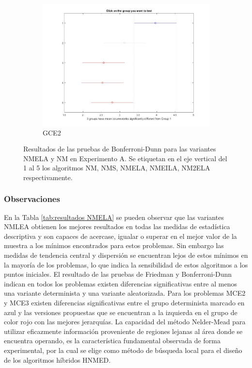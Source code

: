 \begin{figure}
\begin{subfigure}[b]{0.49\linewidth}
		\includegraphics[width=\linewidth]{Figures/NMELA_FB_P5}
		\caption{GCE2} \label{fig:M4} 
	\end{subfigure}
	\caption[Resultados de las pruebas de Bonferroni-Dunn para las variantes NMELA y NM en Experimento A.]{Resultados de las pruebas de Bonferroni-Dunn para las variantes NMELA y NM en Experimento A. Se etiquetan en el eje vertical del 1 al 5 los algoritmos NM, NMS, NMELA, NMEILA, NM2ELA respectivamente.} \label{fig: Bonferroni-Dunn -NMELA} 
	
\end{figure}
\subsubsection{Observaciones}
En la Tabla \ref{tab:resultados NMELA} se pueden observar que las variantes NMLEA obtienen los mejores resultados en todas las medidas de estadística descriptiva y son capaces de acercase, igualar o superar en el mejor valor de la muestra a los mínimos encontrados para estos problemas. Sin embargo las medidas de tendencia central y dispersión  se encuentran lejos de estos mínimos en la mayoría de los problemas, lo que indica la sensibilidad de estos algoritmos a los puntos iniciales. El resultado de las pruebas de Friedman y Bonferroni-Dunn indican en  todos los problemas existen diferencias significativas entre al menos una variante determinista y una variante aleatorizada. Para los problemas MCE2 y MCE3 existen diferencias significativas entre el grupo determinista marcado en azul y las versiones propuestas que se encuentran a la izquierda en el grupo de color rojo con las mejores jerarquías. La capacidad del método Nelder-Mead para utilizar eficazmente información proveniente de regiones lejanas al área donde se encuentra operando, es la característica fundamental observada de forma experimental, por la cual se elige como método de búsqueda local para el diseño de los algoritmos híbridos HNMED. 



